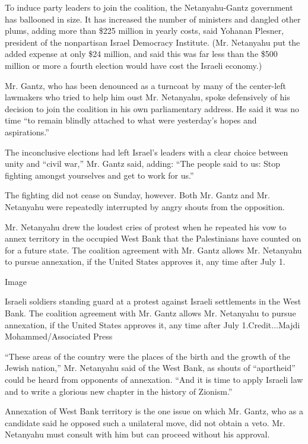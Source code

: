 To induce party leaders to join the coalition, the Netanyahu-Gantz
government has ballooned in size. It has increased the number of
ministers and dangled other plums, adding more than \$225 million in
yearly costs, said Yohanan Plesner, president of the nonpartisan Israel
Democracy Institute. (Mr. Netanyahu put the added expense at only \$24
million, and said this was far less than the \$500 million or more a
fourth election would have cost the Israeli economy.)

Mr. Gantz, who has been denounced as a turncoat by many of the
center-left lawmakers who tried to help him oust Mr. Netanyahu, spoke
defensively of his decision to join the coalition in his own
parliamentary address. He said it was no time ``to remain blindly
attached to what were yesterday's hopes and aspirations.''

The inconclusive elections had left Israel's leaders with a clear choice
between unity and ``civil war,'' Mr. Gantz said, adding: ``The people
said to us: Stop fighting amongst yourselves and get to work for us.''

The fighting did not cease on Sunday, however. Both Mr. Gantz and Mr.
Netanyahu were repeatedly interrupted by angry shouts from the
opposition.

Mr. Netanyahu drew the loudest cries of protest when he repeated his vow
to annex territory in the occupied West Bank that the Palestinians have
counted on for a future state. The coalition agreement with Mr. Gantz
allows Mr. Netanyahu to pursue annexation, if the United States approves
it, any time after July 1.

Image

Israeli soldiers standing guard at a protest against Israeli settlements
in the West Bank. The coalition agreement with Mr. Gantz allows Mr.
Netanyahu to pursue annexation, if the United States approves it, any
time after July 1.Credit...Majdi Mohammed/Associated Press

``These areas of the country were the places of the birth and the growth
of the Jewish nation,'' Mr. Netanyahu said of the West Bank, as shouts
of ``apartheid'' could be heard from opponents of annexation. ``And it
is time to apply Israeli law and to write a glorious new chapter in the
history of Zionism.''

Annexation of West Bank territory is the one issue on which Mr. Gantz,
who as a candidate said he opposed such a unilateral move, did not
obtain a veto. Mr. Netanyahu must consult with him but can proceed
without his approval.

